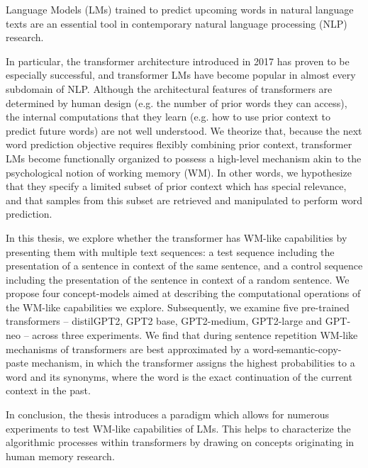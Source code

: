 
Language Models (LMs) trained to predict upcoming words in natural language texts are an essential tool in contemporary natural language processing (NLP) research.

In particular, the transformer architecture introduced in 2017 has proven to be especially successful, and transformer LMs have become popular in almost every subdomain of NLP.
Although the architectural features of transformers are determined by human design (e.g. the number of prior words they can access), the internal computations that they learn (e.g. how to use prior context to predict future words) are not well understood.
We theorize that, because the next word prediction objective requires flexibly combining prior context, transformer LMs become functionally organized to possess a high-level mechanism akin to the psychological notion of working memory (WM). In other words, we hypothesize that they specify a limited subset of prior context which has special relevance, and that samples from this subset are  retrieved and manipulated to perform word prediction.


In this thesis, we explore whether the transformer has WM-like capabilities by presenting them with multiple text sequences: a test sequence including the presentation of a sentence in context of the same sentence, and a control sequence including the presentation of the sentence in context of a random sentence.
We propose four concept-models aimed at describing the computational operations of the WM-like capabilities we explore.
Subsequently, we examine five pre-trained transformers -- distilGPT2, GPT2 base, GPT2-medium, GPT2-large and GPT-neo -- across three experiments.
We find that during sentence repetition WM-like mechanisms of transformers are best approximated by a word-semantic-copy-paste mechanism, in which the transformer assigns the highest probabilities to a word and its synonyms, where the word is the exact continuation of the current context in the past.

In conclusion, the thesis introduces a paradigm which allows for numerous experiments to test WM-like capabilities of LMs.
This helps to characterize the algorithmic processes within transformers by drawing on concepts originating in human memory research.
